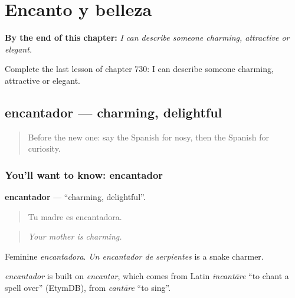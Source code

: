 
\chapter{Encanto y belleza}
\label{ch:es-encanto-y-belleza}

\begin{chapteropening}
\textbf{By the end of this chapter:} \emph{I can describe someone charming, attractive or elegant.}

Complete the last lesson of chapter 730: I can describe someone charming, attractive or elegant.
\end{chapteropening}

\section[encantador]{encantador — charming, delightful}

\label{lesson:ES-C730-encantador}



\begin{quote}
Before the new one: say the Spanish for nosy, then the Spanish for curiosity.
\end{quote}

\subsection*{You'll want to know: encantador}
\textbf{encantador} — \textquotedblleft{}charming, delightful\textquotedblright{}.

\begin{quote}
Tu madre es encantadora.
\end{quote}

\begin{quote}
\emph{Your mother is charming.}
\end{quote}

Feminine \emph{encantadora}. \emph{Un encantador de serpientes} is a snake charmer.

\begin{cousinweb}
\emph{encantador} is built on \emph{encantar}, which comes from Latin \emph{incantāre} \textquotedblleft{}to chant a spell over\textquotedblright{} (EtymDB), from \emph{cantāre} \textquotedblleft{}to sing\textquotedblright{}.
\end{cousinweb}

